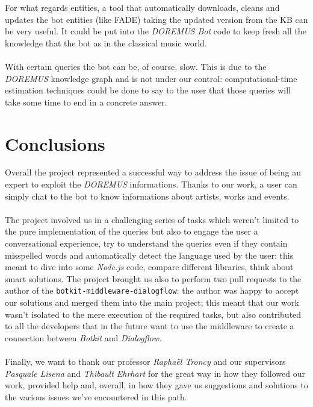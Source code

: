\documentclass[a4paper,12pt]{report}
\begin{document}
	For what regards entities, a tool that automatically downloads, cleans and updates the bot entities (like FADE\cite{fade}) taking the updated version from the KB can be very useful. It could be put into the \textit{DOREMUS Bot} code to keep fresh all the knowledge that the bot as in the classical music world.\\\\
	With certain queries the bot can be, of course, slow. This is due to the \textit{DOREMUS} knowledge graph and is not under our control: computational-time estimation techniques could be done to say to the user that those queries will take some time to end in a concrete answer.
	
	\chapter{Conclusions}
	Overall the project represented a successful way to address the issue of being an expert to exploit the \textit{DOREMUS} informations. Thanks to our work, a user can simply chat to the bot to know informations about artists, works and events.\\\\
	The project involved us in a challenging series of tasks which weren't limited to the pure implementation of the queries but also to engage the user a conversational experience, try to understand the queries even if they contain misspelled words and automatically detect the language used by the user: this meant to dive into some \textit{Node.js} code, compare different libraries, think about smart solutions. The project brought us also to perform two pull requests to the author of the \texttt{botkit-middleware-dialogflow}: the author was happy to accept our solutions and merged them into the main project; this meant that our work wasn't isolated to the mere execution of the required tasks, but also contributed to all the developers that in the future want to use the middleware to create a connection between \textit{Botkit} and \textit{Dialogflow}.\\\\
	Finally, we want to thank our professor \textit{Raphaël Troncy} and our supervisors \textit{Pasquale Lisena} and \textit{Thibault Ehrhart} for the great way in how they followed our work, provided help and, overall, in how they gave us suggestions and solutions to the various issues we've encountered in this path.
	
\end{document}
